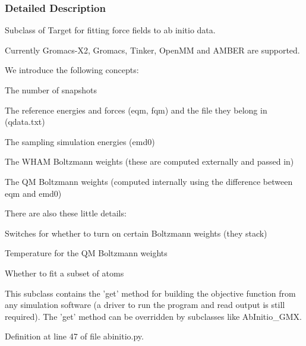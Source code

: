 \subsubsection{Detailed Description}
Subclass of Target for fitting force fields to ab initio data. 

Currently Gromacs-\/\-X2, Gromacs, Tinker, Open\-M\-M and A\-M\-B\-E\-R are supported.

We introduce the following concepts\-:
\begin{DoxyItemize}
\item The number of snapshots
\item The reference energies and forces (eqm, fqm) and the file they belong in (qdata.\-txt)
\item The sampling simulation energies (emd0)
\item The W\-H\-A\-M Boltzmann weights (these are computed externally and passed in)
\item The Q\-M Boltzmann weights (computed internally using the difference between eqm and emd0)
\end{DoxyItemize}

There are also these little details\-:
\begin{DoxyItemize}
\item Switches for whether to turn on certain Boltzmann weights (they stack)
\item Temperature for the Q\-M Boltzmann weights
\item Whether to fit a subset of atoms
\end{DoxyItemize}

This subclass contains the 'get' method for building the objective function from any simulation software (a driver to run the program and read output is still required). The 'get' method can be overridden by subclasses like Ab\-Initio\-\_\-\-G\-M\-X. 

Definition at line 47 of file abinitio.\-py.



